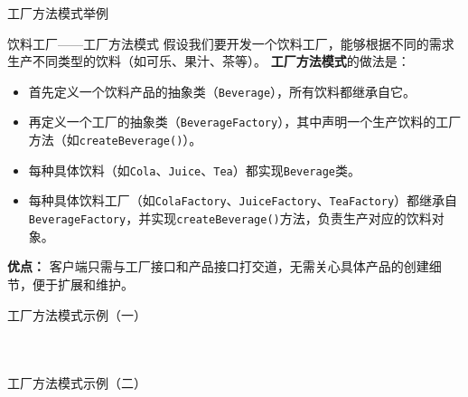 \documentclass[UTF8,aspectratio=169]{beamer}
\begin{document}
\begin{frame}{工厂方法模式举例}
    \begin{exampleytublock}{饮料工厂——工厂方法模式}
        假设我们要开发一个饮料工厂，能够根据不同的需求生产不同类型的饮料（如可乐、果汁、茶等）。
        \textbf{工厂方法模式}的做法是：
        \begin{itemize}
            \item 首先定义一个饮料产品的抽象类（\texttt{Beverage}），所有饮料都继承自它。
            \item 再定义一个工厂的抽象类（\texttt{BeverageFactory}），其中声明一个生产饮料的工厂方法（如\texttt{createBeverage()}）。
            \item 每种具体饮料（如\texttt{Cola}、\texttt{Juice}、\texttt{Tea}）都实现\texttt{Beverage}类。
            \item 每种具体饮料工厂（如\texttt{ColaFactory}、\texttt{JuiceFactory}、\texttt{TeaFactory}）都继承自\texttt{BeverageFactory}，并实现\texttt{createBeverage()}方法，负责生产对应的饮料对象。
        \end{itemize}
        \vspace{0.5em}
        \textbf{优点：} 客户端只需与工厂接口和产品接口打交道，无需关心具体产品的创建细节，便于扩展和维护。
    \end{exampleytublock}
\end{frame}

\begin{frame}{工厂方法模式示例（一）}
    \begin{columns}
        \begin{column}{0.48\textwidth}
            \inputminted[firstline=1, lastline=19]{cpp}{code/factory_method_pattern.cpp}
        \end{column}
        \begin{column}{0.48\textwidth}
            \inputminted[firstline=20, lastline=38]{cpp}{code/factory_method_pattern.cpp}
        \end{column}
    \end{columns}
\end{frame}

\begin{frame}{工厂方法模式示例（二）}
    \begin{columns}
        \begin{column}{0.48\textwidth}
            \inputminted[firstline=40, lastline=55]{cpp}{code/factory_method_pattern.cpp}
        \end{column}
        \begin{column}{0.48\textwidth}
            \inputminted[firstline=56, lastline=70]{cpp}{code/factory_method_pattern.cpp}
        \end{column}
    \end{columns}
\end{frame}
\end{document}
